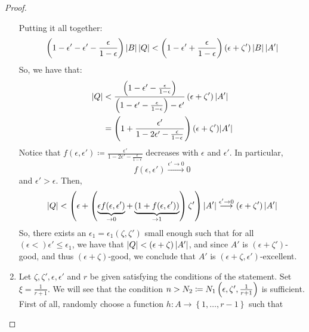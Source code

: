 \begin{proof}
\begin{enumerate}[label=(\alph*), ref=\alph*]
                Putting it all together:
                $$
                    \left( 1 - \epsilon' - \epsilon' - \frac{\epsilon}{1 - \epsilon} \right) \left| B \right| \left| Q \right| <
                    \left( 1 - \epsilon' + \frac{\epsilon}{1 - \epsilon} \right) \left( \epsilon + \zeta' \right) \left| B \right| \left| A' \right|
                $$
                So, we have that:
                \begin{align*}
                    \left| Q \right| & < \frac{\left( 1 - \epsilon' - \frac{\epsilon}{1 - \epsilon} \right)}
                                        {\left( 1 - \epsilon' - \frac{\epsilon}{1 - \epsilon} \right) - \epsilon'}
                                        \left( \epsilon + \zeta' \right) \left| A' \right| \\
                                    & = \left( 1 + \frac{\epsilon'}{1 - 2\epsilon' - \frac{\epsilon}{1 - \epsilon}} \right)
                                        (\epsilon + \zeta') |A'|
                \end{align*}
                Notice that $f(\epsilon, \epsilon') \coloneq \frac{\epsilon'}{1 - 2\epsilon' - \frac{\epsilon}{1 - \epsilon}}$
                decreases with $\epsilon$ and $\epsilon'$.
                In particular,
                $$
                    f(\epsilon, \epsilon') \overset{\epsilon' \to 0}{\longrightarrow} 0
                $$
                and $\epsilon' > \epsilon$.
                Then,
                $$
                    \left| Q \right| < \left( \epsilon + \left( \underbrace{\epsilon f(\epsilon, \epsilon')}_{\to 0} +
                    \underbrace{\left( 1 + f(\epsilon, \epsilon') \right)}_{\to 1} \right) \zeta' \right) |A'|
                    \overset{\epsilon' \to 0}{\longrightarrow} \left( \epsilon + \zeta' \right) |A'|
                $$
                So, there exists an $\epsilon_1 = \epsilon_1(\zeta, \zeta')$ small enough such that for all
                $(\epsilon <) \epsilon' \leq \epsilon_1$, we have that $\left| Q \right| < \left( \epsilon + \zeta \right) |A'|$,
                and since $A'$ is $(\epsilon + \zeta')$-good, and thus $(\epsilon + \zeta)$-good, we conclude that
                $A'$ is $(\epsilon + \zeta, \epsilon')$-excellent.
            \item Let $\zeta, \zeta', \epsilon, \epsilon'$ and $r$ be given satisfying the conditions of the statement.
                Set $\xi = \frac{1}{r + 1}$.
                We will see that the condition $n > N_2 \coloneq N_1\left( \epsilon, \zeta', \frac{1}{r + 1} \right)$ is sufficient.
                First of all, randomly choose a function $h: A \longrightarrow \left\{ 1, \dots, r-1 \right\}$ such that

\end{enumerate}
\end{proof}
